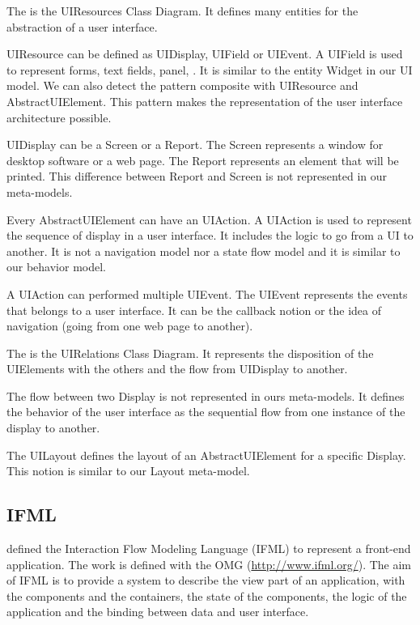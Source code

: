 \documentclass[conference]{IEEEtran}
\begin{document}

The  is the UIResources Class Diagram.
It defines many entities for the abstraction of a user interface.

UIResource can be defined as UIDisplay, UIField or UIEvent.
A UIField is used to represent forms, text fields, panel, \etc.
It is similar to the entity Widget in our UI model.
We can also detect the pattern composite with
    UIResource and AbstractUIElement.
This pattern makes the representation of the
    user interface architecture possible.

UIDisplay can be a Screen or a Report.
The Screen represents a window for desktop software or a web page.
The Report represents an element that will be printed.
This difference between Report and Screen is not represented in our meta-models.

Every AbstractUIElement can have an UIAction.
A UIAction is used to represent the sequence of display in a user interface.
It includes the logic to go from a UI to another.
It is not a navigation model nor a state flow model and
    it is similar to our behavior model.

A UIAction can performed multiple UIEvent.
The UIEvent represents the events that belongs to a user interface.
It can be the callback notion or the idea of navigation (\ie going from one web page to another).


The  is the UIRelations Class Diagram.
It represents the disposition of the UIElements with the others and the flow from
    UIDisplay to another.

The flow between two Display is not represented in ours meta-models.
It defines the behavior of the user interface as the sequential 
    flow from one instance of the display to another.

The UILayout defines the layout of an AbstractUIElement for a specific Display.
This notion is similar to our Layout meta-model.

\subsection{IFML}
\label{sec:ifml}

\citet{brambilla2014interaction} defined the Interaction Flow Modeling Language (IFML) to represent a front-end application.
The work is defined with the OMG (\url{http://www.ifml.org/}).
The aim of IFML is to provide a system to describe the view part of an application,
    with the components and the containers, the state of the components,
    the logic of the application and the binding between data and user interface.
\end{document}
